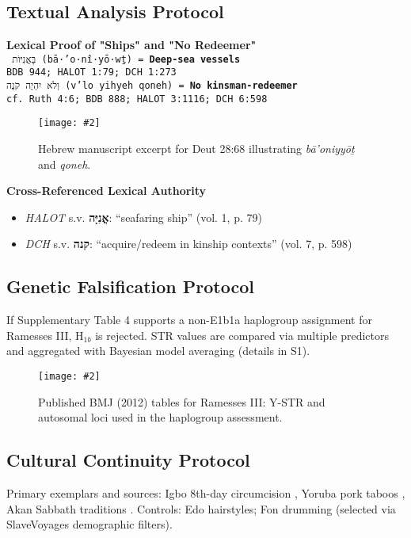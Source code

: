 \documentclass[11pt]{article}
\newcommand{\hebrewanchor}[2]{\begin{framed}\noindent\textbf{#1}\\
\texttt{\footnotesize #2}\end{framed}}
\newcommand{\safeinclude}[2][0.95\linewidth]{%
  \texttt{[image: \#2]}%
}
\begin{document}
\subsection{Textual Analysis Protocol}
\hebrewanchor{Lexical Proof of "Ships" and "No Redeemer"}{
בָּאֳנִיּוֹת (bā·’o·nî·yō·wṯ) = \textbf{Deep-sea vessels} \\
\footnotesize{BDB 944; HALOT 1:79; DCH 1:273} \\[5pt]
וְלֹא יִהְיֶה קֹנֶה (v'lo yihyeh qoneh) = \textbf{No kinsman-redeemer} \\
\footnotesize{cf. Ruth 4:6; BDB 888; HALOT 3:1116; DCH 6:598}
}

\begin{figure}[htbp]
  \centering
  \safeinclude[0.8\linewidth]{Deut.png}
  \caption{Hebrew manuscript excerpt for Deut 28:68 illustrating \textit{bā’oniyyōṯ} and \textit{qoneh}.}
  \label{fig:deut-manuscript}
\end{figure}

\begin{framed}
\noindent\textbf{Cross-Referenced Lexical Authority}\\
\begin{itemize}[leftmargin=1.2em]
\item \textit{HALOT} s.v. \textbf{אֳנִיָּה}: “seafaring ship” (vol. 1, p. 79)
\item \textit{DCH} s.v. \textbf{קנה}: “acquire/redeem in kinship contexts” (vol. 7, p. 598)
\end{itemize}
\end{framed}

\subsection{Genetic Falsification Protocol}
If \textcite{hawass2012} Supplementary Table 4 supports a non-E1b1a haplogroup assignment for Ramesses III, H$_{1b}$ is rejected. STR values are compared via multiple predictors and aggregated with Bayesian model averaging (details in S1).

\begin{figure}[htbp]
  \centering
  \safeinclude[\linewidth]{ramessesIII_bmj2012_ystr_autosomal.png}
  \caption{Published BMJ (2012) tables for Ramesses III: Y-STR and autosomal loci used in the haplogroup assessment.}
  \label{fig:bmj-ystr}
\end{figure}

\subsection{Cultural Continuity Protocol}
Primary exemplars and sources: Igbo 8th-day circumcision \parencite{equiano1789}, Yoruba pork taboos \parencite{basden1921}, Akan Sabbath traditions \parencite{williams1930}. Controls: Edo hairstyles; Fon drumming (selected via SlaveVoyages demographic filters).
\end{document}
